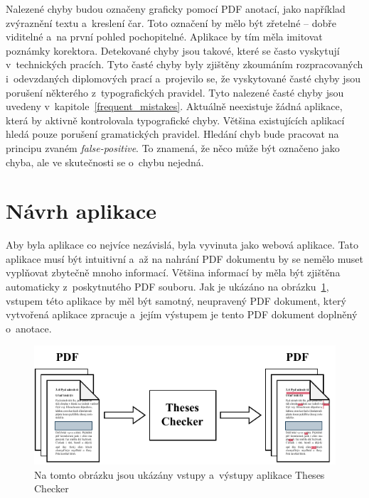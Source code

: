 Nalezené chyby budou označeny graficky pomocí PDF anotací, jako například
zvýraznění textu a~kreslení čar. Toto označení by mělo být zřetelné -- dobře
viditelné a~na první pohled pochopitelné. Aplikace by tím měla imitovat
poznámky korektora. Detekované chyby jsou takové, které se často vyskytují 
v~technických pracích.
Tyto časté chyby byly zjištěny zkoumáním rozpracovaných i~odevzdaných
diplomových prací a~projevilo se, že vyskytované časté chyby jsou porušení
některého z~typografických pravidel. Tyto nalezené časté chyby jsou uvedeny
v~kapitole~\ref{frequent_mistakes}. 
Aktuálně neexistuje žádná aplikace, která by aktivně kontrolovala typografické
chyby. Většina existujících aplikací hledá pouze porušení gramatických pravidel.
Hledání chyb bude pracovat na principu zvaném \emph{false-positive}. To znamená,
že něco může být označeno jako chyba, ale ve skutečnosti se o~chybu nejedná.



\section{Návrh aplikace}
Aby byla aplikace co nejvíce nezávislá, byla vyvinuta jako webová aplikace.
Tato aplikace musí být intuitivní a~až na nahrání PDF dokumentu by se nemělo
muset vyplňovat zbytečně mnoho informací. Většina informací by měla být
zjištěna automaticky z~poskytnutého PDF souboru. Jak je ukázáno na
obrázku~\ref{pic_theses_checker_dia}, vstupem této aplikace by měl být
samotný, neupravený PDF dokument, který vytvořená aplikace zpracuje
a~jejím výstupem je tento PDF dokument doplněný o~anotace.

\begin{figure}[H]
    \centering
    \includegraphics[width=\linewidth]{obrazky-figures/Theses_Checker_diagram.pdf}
    \caption{
        Na tomto obrázku jsou ukázány vstupy a~výstupy aplikace Theses Checker
    }
    \label{pic_theses_checker_dia}
\end{figure}

